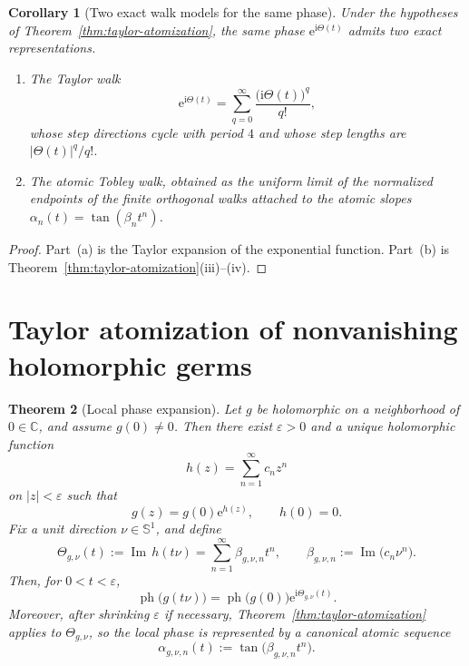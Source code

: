 \documentclass[11pt,a4paper]{article}
\numberwithin{equation}{section}
\newtheorem{theorem}{Theorem}[section]
\newtheorem{corollary}[theorem]{Corollary}
\theoremstyle{definition}
\theoremstyle{remark}
\DeclareMathOperator{\Ima}{Im}
\newcommand{\CC}{\mathbb C}
\newcommand{\Sph}{\mathbb S^1}
\newcommand{\ph}{\operatorname{ph}}
\newcommand{\e}{\mathrm e}
\newcommand{\ii}{\mathrm i}
\begin{document}
\begin{corollary}[Two exact walk models for the same phase]\label{cor:two-walks}
Under the hypotheses of Theorem~\ref{thm:taylor-atomization}, the same phase $\e^{\ii\Theta(t)}$ admits two exact representations.
\begin{enumerate}[label=(\alph*)]
\item The \emph{Taylor walk}
\[
\e^{\ii\Theta(t)}=\sum_{q=0}^{\infty}\frac{\bigl(\ii\Theta(t)\bigr)^q}{q!},
\]
whose step directions cycle with period $4$ and whose step lengths are $|\Theta(t)|^q/q!$.
\item The \emph{atomic Tobley walk}, obtained as the uniform limit of the normalized endpoints of the finite orthogonal walks attached to the atomic slopes $\alpha_n(t)=\tan(\beta_n t^n)$.
\end{enumerate}
\end{corollary}

\begin{proof}
Part~(a) is the Taylor expansion of the exponential function.  Part~(b) is Theorem~\ref{thm:taylor-atomization}(iii)--(iv).
\end{proof}

\section{Taylor atomization of nonvanishing holomorphic germs}

\begin{theorem}[Local phase expansion]\label{thm:nonvanishing-germ}
Let $g$ be holomorphic on a neighborhood of $0\in\CC$, and assume $g(0)\neq0$.  Then there exist $\varepsilon>0$ and a unique holomorphic function
\[
h(z)=\sum_{n=1}^{\infty} c_n z^n
\]
on $|z|<\varepsilon$ such that
\[
g(z)=g(0)\e^{h(z)},
\qquad h(0)=0.
\]
Fix a unit direction $\nu\in\Sph$, and define
\[
\Theta_{g,\nu}(t):=\Ima\,h(t\nu)
=\sum_{n=1}^{\infty}\beta_{g,\nu,n} t^n,
\qquad
\beta_{g,\nu,n}:=\Ima\bigl(c_n\nu^n\bigr).
\]
Then, for $0<t<\varepsilon$,
\[
\ph\bigl(g(t\nu)\bigr)=\ph\bigl(g(0)\bigr)\e^{\ii\Theta_{g,\nu}(t)}.
\]
Moreover, after shrinking $\varepsilon$ if necessary, Theorem~\ref{thm:taylor-atomization} applies to $\Theta_{g,\nu}$, so the local phase is represented by a canonical atomic sequence
\[
\alpha_{g,\nu,n}(t):=\tan\bigl(\beta_{g,\nu,n}t^n\bigr).
\]
\end{theorem}
\end{document}
